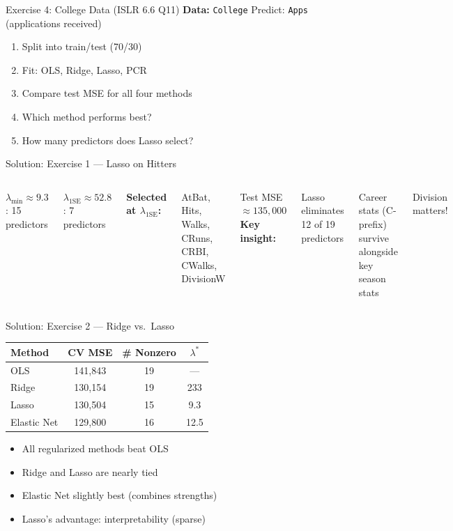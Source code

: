 \documentclass[aspectratio=169, 11pt]{beamer}
\begin{document}
\begin{frame}{Exercise 4: College Data (ISLR 6.6 Q11)}
\textbf{Data:} \texttt{College} \hfill Predict: \texttt{Apps} (applications received)
\begin{enumerate}
  \item Split into train/test (70/30)
  \item Fit: OLS, Ridge, Lasso, PCR
  \item Compare test MSE for all four methods
  \item Which method performs best?
  \item How many predictors does Lasso select?
\end{enumerate}
\end{frame}

\begin{frame}{Solution: Exercise 1 --- Lasso on Hitters}
\begin{columns}
$\lambda_{\min} \approx 9.3$: 15 predictors

$\lambda_{\text{1SE}} \approx 52.8$: 7 predictors

\vspace{0.3em}
\textbf{Selected at $\lambda_{\text{1SE}}$:}

AtBat, Hits, Walks, CRuns, CRBI, CWalks, DivisionW

\vspace{0.3em}
Test MSE $\approx 135{,}000$
\textbf{Key insight:}

Lasso eliminates 12 of 19 predictors

Career stats (C-prefix) survive alongside key season stats

Division matters!
\end{columns}
\end{frame}

\begin{frame}{Solution: Exercise 2 --- Ridge vs.\ Lasso}
\begin{center}
\begin{tabular}{lccc}
\toprule
Method & CV MSE & \# Nonzero & $\lambda^*$ \\
\midrule
OLS & 141,843 & 19 & --- \\
Ridge & 130,154 & 19 & 233 \\
Lasso & 130,504 & 15 & 9.3 \\
Elastic Net & 129,800 & 16 & 12.5 \\
\bottomrule
\end{tabular}
\end{center}
\begin{itemize}
  \item All regularized methods beat OLS
  \item Ridge and Lasso are nearly tied
  \item Elastic Net slightly best (combines strengths)
  \item Lasso's advantage: interpretability (sparse)
\end{itemize}
\end{frame}
\end{document}
